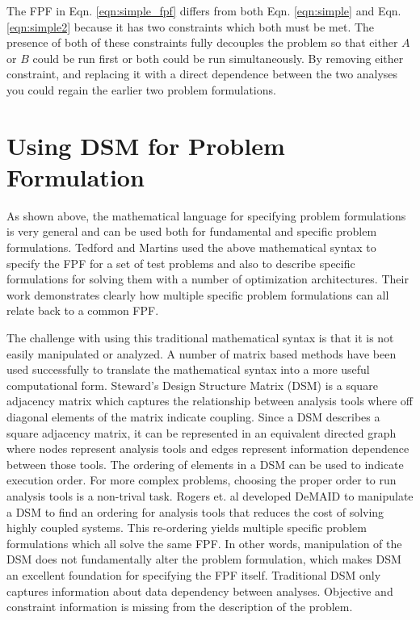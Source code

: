     The FPF in Eqn. \ref{eqn:simple_fpf} differs from both Eqn. \ref{eqn:simple} and Eqn. \ref{eqn:simple2} because it has 
    two constraints which both must be met. The presence of both of these constraints fully decouples the problem so that 
    either $A$ or $B$ could be run first or both could be run simultaneously. By removing either constraint, and replacing 
    it with a direct dependence between the two analyses you could regain the earlier two problem formulations.     


\section{Using DSM for Problem Formulation}

    As shown above, the mathematical language for specifying problem formulations is very general and can be used both for 
    fundamental and specific problem formulations. Tedford and Martins used the above mathematical syntax to specify the 
    FPF for a set of test problems and also to describe specific formulations for solving them with a 
    number of optimization architectures\cite{Tedford2009}. Their work demonstrates clearly how multiple specific 
    problem formulations can all relate back to a common FPF. 
    
    The challenge with using this traditional mathematical syntax is that it is not easily manipulated or analyzed. 
    A number of matrix based methods have been used successfully to translate the mathematical syntax into a more useful computational form. 
    Steward's Design Structure Matrix (DSM) is a square adjacency matrix which captures the relationship between analysis tools where off 
    diagonal elements of the matrix indicate coupling\cite{Steward1981}. Since a DSM describes a square adjacency matrix, 
    it can be represented in an equivalent directed graph where nodes represent analysis tools and 
    edges represent information dependence between those tools. The ordering of elements in a DSM can be used to indicate 
    execution order.  For more complex problems, choosing the proper order to run analysis tools is a non-trival task. 
    Rogers et. al developed DeMAID to manipulate a DSM to find an ordering for analysis tools that 
    reduces the cost of solving highly coupled systems\cite{Rogers1996}. This re-ordering yields multiple specific problem 
    formulations which all solve the same FPF. In other words, manipulation of the DSM does not fundamentally alter
    the problem formulation, which makes DSM an excellent foundation for specifying the FPF itself. Traditional DSM only captures information 
    about data dependency between analyses. Objective and constraint information is missing from the description of the problem. 
    
